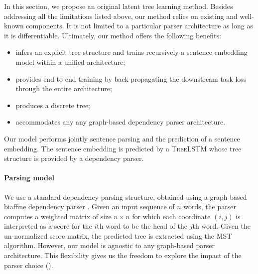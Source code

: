 In this section, we propose an original latent tree learning method. Besides addressing all the limitations listed above, our method relies on existing and well-known components. It is not limited to a particular parser architecture as long as it is differentiable. Ultimately, our method offers the following benefits:
\begin{itemize}
    \item infers an explicit tree structure and trains recursively a sentence embedding model within a unified architecture;
    \item provides end-to-end training by back-propagating the downstream task loss through the entire architecture;
    \item produces a discrete tree;
    \item accommodates any any graph-based dependency parser architecture.
\end{itemize}





Our model performs jointly sentence parsing and the prediction of a sentence embedding. The sentence embedding is predicted by a \textsc{TreeLSTM} whose tree structure is provided by a dependency parser.

\paragraph{Parsing model} We use a standard dependency parsing structure, obtained using a graph-based biaffine dependency parser \parencite{dozat_17}. Given an input sequence of $n$ words, the parser computes a weighted matrix of size $n \times n$ for which each coordinate $(i, j)$ is interpreted as a score for the $i$th word to be the head of the $j$th word. Given the un-normalized score matrix, the predicted tree is extracted using the MST algorithm. However, our model is agnostic to any graph-based parser architecture. This flexibility gives us the freedom to explore the impact of the parser choice ().

